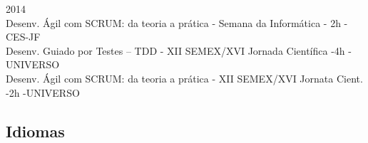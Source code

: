 \documentclass[12pt, a4paper, sans]{moderncv}
\begin{document}
\cventry{}
{}{2014}{
\\Desenv. Ágil com SCRUM: da teoria a prática - Semana da Informática - 2h - CES-JF
\\Desenv. Guiado por Testes – TDD  - XII SEMEX/XVI Jornada Científica -4h - UNIVERSO
\\Desenv. Ágil com SCRUM: da teoria a prática - XII SEMEX/XVI Jornata Cient. -2h -UNIVERSO
}{}{}


%
%

\subsection{Idiomas}

%
%

\end{document}
